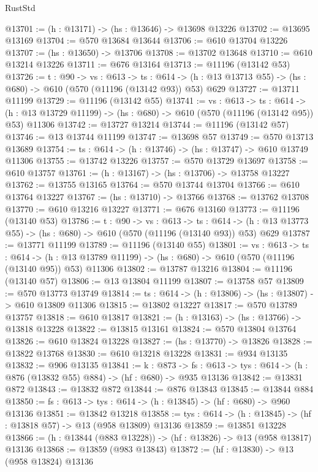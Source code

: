 \begin{lexlean}{RustStd}
\begin{coremodule}
@13701 := (h : @13171) -> (hs : @13646) -> @13698 @13226
@13702 := @13695 @13169
@13704 := @570 @13684 @13644
@13706 := @610 @13704 @13226
@13707 := (hs : @13650) -> @13706
@13708 := @13702 @13648
@13710 := @610 @13214 @13226
@13711 := @676 @13164
@13713 := @11196 (@13142 @53)
@13726 := {t : @90} ->
  {vs : @613} ->
  {ts : @614} -> (h : @13 @13713 @55) -> (hs : @680) -> @610 (@570 (@11196 (@13142 @93)) @53) @629
@13727 := @13711 @11199
@13729 := @11196 (@13142 @55)
@13741 := {vs : @613} ->
  {ts : @614} ->
  (h : @13 @13729 @11199) -> (hs : @680) -> @610 (@570 (@11196 (@13142 @95)) @53) @11306
@13742 := @13727 @13214
@13744 := @11196 (@13142 @57)
@13746 := @13 @13744 @11199
@13747 := @13698 @57
@13749 := @570 @13713 @13689
@13754 := {ts : @614} -> (h : @13746) -> (hs : @13747) -> @610 @13749 @11306
@13755 := @13742 @13226
@13757 := @570 @13729 @13697
@13758 := @610 @13757
@13761 := (h : @13167) -> (hs : @13706) -> @13758 @13227
@13762 := @13755 @13165
@13764 := @570 @13744 @13704
@13766 := @610 @13764 @13227
@13767 := (hs : @13710) -> @13766
@13768 := @13762 @13708
@13770 := @610 @13216 @13227
@13771 := @676 @13160
@13773 := @11196 (@13140 @53)
@13786 := {t : @90} ->
  {vs : @613} ->
  {ts : @614} -> (h : @13 @13773 @55) -> (hs : @680) -> @610 (@570 (@11196 (@13140 @93)) @53) @629
@13787 := @13771 @11199
@13789 := @11196 (@13140 @55)
@13801 := {vs : @613} ->
  {ts : @614} ->
  (h : @13 @13789 @11199) -> (hs : @680) -> @610 (@570 (@11196 (@13140 @95)) @53) @11306
@13802 := @13787 @13216
@13804 := @11196 (@13140 @57)
@13806 := @13 @13804 @11199
@13807 := @13758 @57
@13809 := @570 @13773 @13749
@13814 := {ts : @614} -> (h : @13806) -> (hs : @13807) -> @610 @13809 @11306
@13815 := @13802 @13227
@13817 := @570 @13789 @13757
@13818 := @610 @13817
@13821 := (h : @13163) -> (hs : @13766) -> @13818 @13228
@13822 := @13815 @13161
@13824 := @570 @13804 @13764
@13826 := @610 @13824 @13228
@13827 := (hs : @13770) -> @13826
@13828 := @13822 @13768
@13830 := @610 @13218 @13228
@13831 := @934 @13135
@13832 := @906 @13135
@13841 := {k : @873} ->
  {fs : @613} -> {tys : @614} -> (h : @876 (@13832 @55) @884) -> (hf : @680) -> @935 @13136
@13842 := @13831 @872
@13843 := @13832 @872
@13844 := @876 @13843
@13845 := @13844 @884
@13850 := {fs : @613} -> {tys : @614} -> (h : @13845) -> (hf : @680) -> @960 @13136
@13851 := @13842 @13218
@13858 := {tys : @614} -> (h : @13845) -> (hf : @13818 @57) -> @13 (@958 @13809) @13136
@13859 := @13851 @13228
@13866 := (h : @13844 (@883 @13228)) -> (hf : @13826) -> @13 (@958 @13817) @13136
@13868 := @13859 (@983 @13843)
@13872 := (hf : @13830) -> @13 (@958 @13824) @13136

\end{coremodule}
\end{lexlean}
